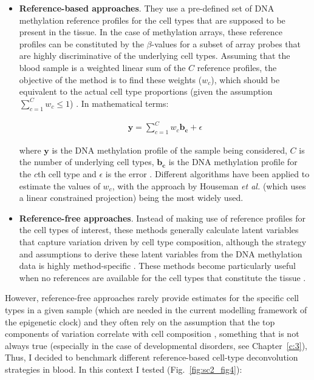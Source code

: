 \begin{itemize}
	
	\item \textbf{Reference-based approaches}. They use a pre-defined set of DNA methylation reference profiles for the cell types that are supposed to be present in the tissue. In the case of methylation arrays, these reference profiles can be constituted by the $\beta$-values for a subset of array probes that are highly discriminative of the underlying cell types. Assuming that the blood sample is a weighted linear sum of the $C$ reference profiles, the objective of the method is to find these weights ($w_c$), which should be equivalent to the actual cell type proportions (given the assumption $\sum_{c=1}^{C} w_c \leq 1$) \cite{Teschendorff2017}. In mathematical terms:
	
	\begin{align}
	\mathbf{y} = \sum_{c=1}^{C} w_c \mathbf{b_c} + \epsilon
	\end{align}
	
	where $\mathbf{y}$ is the DNA methylation profile of the sample being considered, $C$ is the number of underlying cell types, $\mathbf{b_c}$ is the DNA methylation profile for the $c$th cell type and $\epsilon$ is the error \cite{Teschendorff2017a}. Different algorithms have been applied to estimate the values of $w_c$, with the approach by Houseman \textit{et al.} (which uses a linear constrained projection) \cite{Houseman2012} being the most widely used. 
	
	\item \textbf{Reference-free approaches}. Instead of making use of reference profiles for the cell types of interest, these methods generally calculate latent variables that capture variation driven by cell type composition, although the strategy and assumptions to derive these latent variables from the DNA methylation data is highly method-specific \cite{Teschendorff2017}. These methods become particularly useful when no references are available for the cell types that constitute the tissue \cite{Teschendorff2017}.
	
\end{itemize} 

However, reference-free approaches rarely provide estimates for the specific cell types in a given sample \cite{Teschendorff2017} (which are needed in the current modelling framework of the epigenetic clock) and they often rely on the assumption that the top components of variation correlate with cell composition \cite{Teschendorff2017a}, something that is not always true (especially in the case of developmental disorders, see Chapter~\ref{c:3}), Thus, I decided to benchmark different reference-based cell-type deconvolution strategies in blood. In this context I tested (Fig.~\ref{fig:sc2_fig4}):

